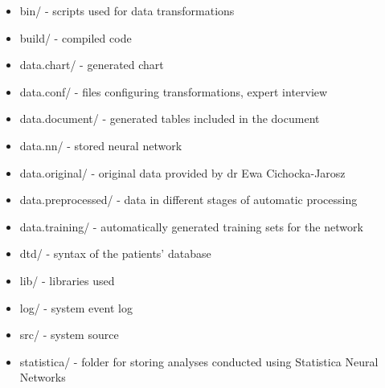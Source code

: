 \documentclass[10pt,oneside]{memoir}
\begin{document}
\begin{itemize}


\item bin/ - scripts used for data transformations

\item build/ - compiled code

\item data.chart/ - generated chart

\item data.conf/ - files configuring transformations, expert interview

\item data.document/ - generated tables included in the document

\item data.nn/ - stored neural network

\item data.original/ - original data provided by dr Ewa Cichocka-Jarosz

\item data.preprocessed/ - data in different stages of automatic processing

\item data.training/ - automatically generated training sets for the network

\item dtd/ - syntax of the patients' database

\item lib/ - libraries used

\item log/ - system event log

\item src/ - system source

\item statistica/ - folder for storing analyses conducted using Statistica Neural Networks
\end{itemize}

~\nocite{Bevington:Robinson:1992}


~\nocite{Bezzi1:Gundersen:2004}


~\nocite{Grevers:Rocken:2002}


~\nocite{IBM:2005:Bluegene}


~\nocite{Immunologia:2002}


~\nocite{Lula:1998}


~\nocite{Podolak:2003:Perceptron}


~\nocite{Rutkowska:Pilinski:Rutkowski:1999}
\end{document}
